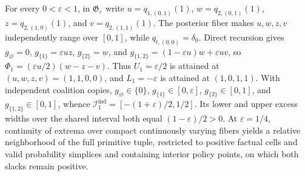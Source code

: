 For every \(0<\varepsilon<1\), in \(\mathfrak G_{\varepsilon}\) write \(u=q_{1,(0,1)}(1)\), \(w=q_{2,(0,1)}(1)\), \(z=q_{2,(1,0)}(1)\), and \(v=q_{2,(1,1)}(1)\). The posterior fiber makes \(u,w,z,v\) independently range over \([0,1]\), while \(q_{t,(0,0)}=\delta_0\). Direct recursion gives \(g_{\varnothing}=0\), \(g_{\{1\}}=\varepsilon uz\), \(g_{\{2\}}=w\), and \(g_{\{1,2\}}=(1-\varepsilon u)w+\varepsilon uv\), so \(\Phi_1=(\varepsilon u/2)(w-z-v)\). Thus \(U_1=\varepsilon/2\) is attained at \((u,w,z,v)=(1,1,0,0)\), and \(L_1=-\varepsilon\) is attained at \((1,0,1,1)\). With independent coalition copies, \(g_{\varnothing}\in\{0\}\), \(g_{\{1\}}\in[0,\varepsilon]\), \(g_{\{2\}}\in[0,1]\), and \(g_{\{1,2\}}\in[0,1]\), whence \(\mathcal I_1^{\mathrm{ind}}=[-(1+\varepsilon)/2,1/2]\). Its lower and upper excess widths over the shared interval both equal \((1-\varepsilon)/2>0\). At \(\varepsilon=1/4\), continuity of extrema over compact continuously varying fibers yields a relative neighborhood of the full primitive tuple, restricted to positive factual cells and valid probability simplices and containing interior policy points, on which both slacks remain positive.